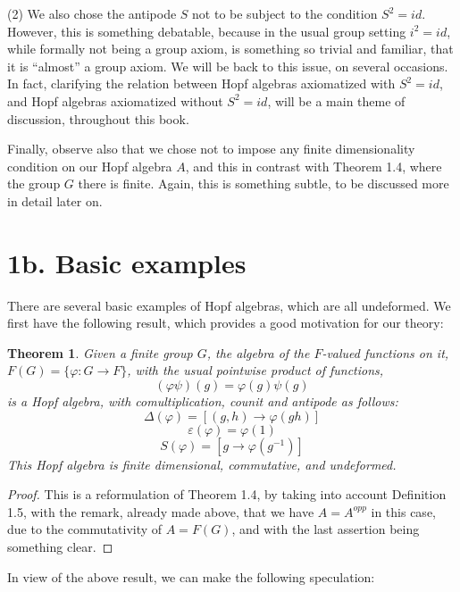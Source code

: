\documentclass[12pt]{amsbook}
\newtheorem{theorem}{Theorem}[chapter]
\begin{document}
\bigskip

(2) We also chose the antipode $S$ not to be subject to the condition $S^2=id$. However, this is something debatable, because in the usual group setting $i^2=id$, while formally not being a group axiom, is something so trivial and familiar, that it is ``almost'' a group axiom. We will be back to this issue, on several occasions. In fact, clarifying the relation between Hopf algebras axiomatized with $S^2=id$, and Hopf algebras axiomatized without $S^2=id$, will be a main theme of discussion, throughout this book.

\bigskip

Finally, observe also that we chose not to impose any finite dimensionality condition on our Hopf algebra $A$, and this in contrast with Theorem 1.4, where the group $G$ there is finite. Again, this is something subtle, to be discussed more in detail later on.

\section*{1b. Basic examples}

There are several basic examples of Hopf algebras, which are all undeformed. We first have the following result, which provides a good motivation for our theory:


\begin{theorem}
Given a finite group $G$, the algebra of the $F$-valued functions on it, $F(G)=\{\varphi:G\to F\}$, with the usual pointwise product of functions,
$$(\varphi\psi)(g)=\varphi(g)\psi(g)$$
is a Hopf algebra, with comultiplication, counit and antipode as follows:
$$\Delta(\varphi)=[(g,h)\to \varphi(gh)]$$
$$\varepsilon(\varphi)=\varphi(1)$$
$$S(\varphi)=[g\to\varphi(g^{-1})]$$
This Hopf algebra is finite dimensional, commutative, and undeformed.
\end{theorem}

\begin{proof}
This is a reformulation of Theorem 1.4, by taking into account Definition 1.5, with the remark, already made above, that we have $A=A^{opp}$ in this case, due to the commutativity of $A=F(G)$, and with the last assertion being something clear.
\end{proof}

In view of the above result, we can make the following speculation:

\end{document}
